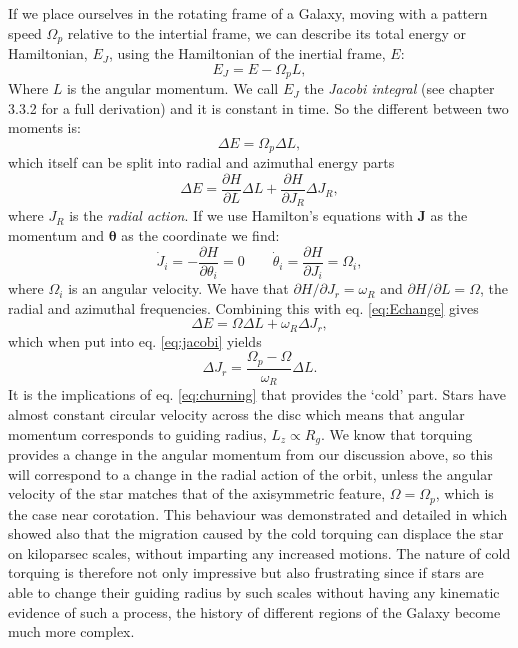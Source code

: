 If we place ourselves in the rotating frame of a Galaxy, moving with a pattern speed $\Omega_p$ relative to the intertial frame, we can describe its total energy or Hamiltonian, $E_J$, using the Hamiltonian of the inertial frame, $E$:
\begin{equation}\label{eq:jacobi}
    E_J = E - \Omega_pL,
\end{equation}
Where $L$ is the angular momentum. We call $E_J$ the \textit{Jacobi integral} (see \citealt{binney:08} chapter 3.3.2 for a full derivation) and it is constant in time. So the different between two moments is:
\begin{equation}
    \Delta E = \Omega_p\Delta L,
\end{equation}
which itself can be split into radial and azimuthal energy parts
\begin{equation}\label{eq:Echange}
    \Delta E = \frac{\partial H}{\partial L}\Delta L + \frac{\partial H}{\partial J_R}\Delta J_R,
\end{equation}
where $J_R$ is the \textit{radial action}. If we use Hamilton's equations with $\pmb{J}$ as the momentum and $\pmb{\theta}$ as the coordinate we find:
\begin{equation}
    \dot{J}_i = - \frac{\partial H}{\partial \theta_i} = 0 \qquad \dot{\theta}_i = \frac{\partial H}{\partial J_i} = \Omega_i,
\end{equation}
where $\Omega_i$ is an angular velocity. We have that $\partial H / \partial J_r = \omega_R$ and $\partial H / \partial L = \Omega$, the radial and azimuthal frequencies. Combining this with eq. \eqref{eq:Echange} gives
\begin{equation}
    \Delta E = \Omega\Delta L + \omega_R \Delta J_r,
\end{equation}
which when put into eq. \eqref{eq:jacobi} yields
\begin{equation}\label{eq:churning}
    \Delta J_r = \frac{\Omega_p - \Omega}{\omega_R}\Delta L.
\end{equation}
It is the implications of eq. \eqref{eq:churning} that provides the `cold' part. Stars have almost constant circular velocity across the disc which means that angular momentum corresponds to guiding radius, $L_z \propto R_g$. We know that torquing provides a change in the angular momentum from our discussion above, so this will correspond to a change in the radial action of the orbit, unless the angular velocity of the star matches that of the axisymmetric feature, $\Omega = \Omega_p$, which is the case near corotation. This behaviour was demonstrated and detailed in \cite{sellwood:02} which showed also that the migration caused by the cold torquing can displace the star on kiloparsec scales, without imparting any increased motions. The nature of cold torquing is therefore not only impressive but also frustrating since if stars are able to change their guiding radius by such scales without having any kinematic evidence of such a process, the history of different regions of the Galaxy become much more complex. 

